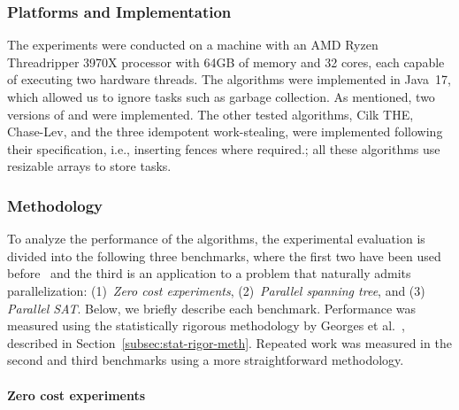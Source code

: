 \subsubsection{\label{subsec:implementation}Platforms and Implementation}

The experiments were conducted on a machine with an AMD Ryzen Threadripper 3970X processor with 64GB of memory and 32 cores, each capable of executing two hardware threads. The algorithms were implemented in Java~17, which allowed us to ignore tasks such as garbage collection.  As mentioned, two versions of \NCWSM and \BNCWSM were implemented. The other tested algorithms, Cilk THE, Chase-Lev, and the three idempotent work-stealing, were implemented following their specification, i.e., inserting fences where required.; all these algorithms use resizable arrays to store tasks.

\subsubsection{\label{subsec:methodology}Methodology}

To analyze the performance of the algorithms, the experimental evaluation is divided into the following three benchmarks, where the first two have been used before~\cite{DBLP_conf_pldi_FrigoLR98, maged.vechev.2009, fencefreework} and the third is an application to a problem that naturally admits parallelization: (1)~\textit{Zero cost experiments}, (2)~\textit{Parallel spanning tree}, and (3) \textit{Parallel SAT}. Below, we briefly describe each benchmark.  Performance was measured using the statistically rigorous methodology by Georges et al.~\cite{DBLP_conf_oopsla_GeorgesBE07}, described in Section~\ref{subsec:stat-rigor-meth}.  Repeated work was measured in the second and third benchmarks using a more straightforward methodology.

\paragraph*{Zero cost experiments\label{zero-cost-experiment}}


